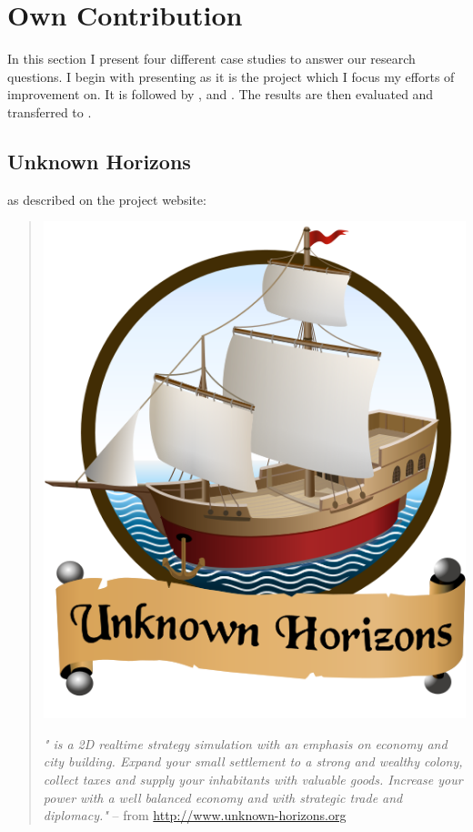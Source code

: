 \section{Own Contribution}
In this section I present four different case studies to answer our research questions. I begin with presenting
\UH{} as it is the project which I focus my efforts of improvement on. It is followed by \BOW{}, \GLEST{} and \AD{}.
The results are then evaluated and transferred to \UH{}.

\subsection{Unknown Horizons}
\UH{} as described on the project website:
\begin{quote}

\begin{center}\includegraphics[scale=0.2]{pics/uhlogo}\end{center}
\textit{"\UH{} is a 2D realtime strategy simulation with an emphasis on economy and city building. Expand your small settlement
to a strong and wealthy colony, collect taxes and supply your inhabitants with valuable goods. Increase your power with
a well balanced economy and with strategic trade and diplomacy."} -- from \url{http://www.unknown-horizons.org}
\end{quote}

